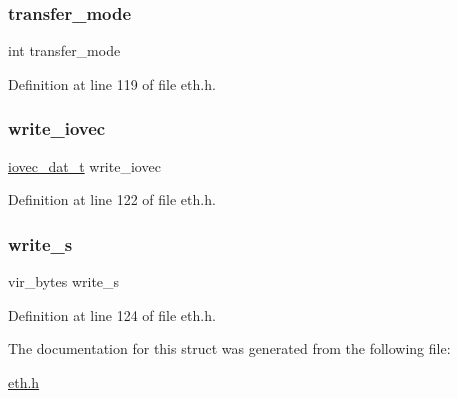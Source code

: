 \hypertarget{structeth__card_aa59025dc15d9260cdf9389d0a66c7804}{}\label{structeth__card_aa59025dc15d9260cdf9389d0a66c7804} 
\subsubsection{\texorpdfstring{transfer\+\_\+mode}{transfer\_mode}}
{\footnotesize\ttfamily int transfer\+\_\+mode}



Definition at line 119 of file eth.\+h.

\hypertarget{structeth__card_a4848915b06b19c977c691138f361f662}{}\label{structeth__card_a4848915b06b19c977c691138f361f662} 
\subsubsection{\texorpdfstring{write\+\_\+iovec}{write\_iovec}}
{\footnotesize\ttfamily \hyperlink{eth_8h_abdec48788bda4ee60b73595dc65e65d5}{iovec\+\_\+dat\+\_\+t} write\+\_\+iovec}



Definition at line 122 of file eth.\+h.

\hypertarget{structeth__card_a4dc611dff34a652e69dbcd42ecd81940}{}\label{structeth__card_a4dc611dff34a652e69dbcd42ecd81940} 
\subsubsection{\texorpdfstring{write\+\_\+s}{write\_s}}
{\footnotesize\ttfamily vir\+\_\+bytes write\+\_\+s}



Definition at line 124 of file eth.\+h.



The documentation for this struct was generated from the following file\+:\begin{DoxyCompactItemize}
\item 
\hyperlink{eth_8h}{eth.\+h}\end{DoxyCompactItemize}
